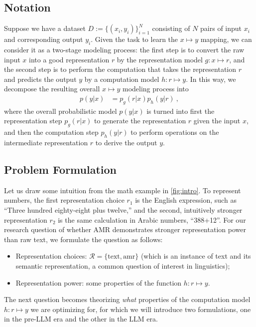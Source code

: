 \subsection{Notation}
Suppose we have a dataset $D:= \{(x_i, y_i)\}_{i=1}^N$ consisting of $N$ pairs of input $x_i$ and corresponding output $y_i$. 
Given the task to learn
the $x \mapsto y$ mapping, we can consider it as a two-stage modeling process: the first step is to convert the raw input $x$ into a good representation $r$ by the representation model $g: x \mapsto r
$,
and the second step is to perform the computation that takes the representation $r$ and predicts the output  $y$ by a computation model $h: r \mapsto y$. In this way, we decompose the resulting
overall $x \mapsto y$ modeling process into
\begin{align}
p(y|x) & = p_g(r|x) p_h(y|r)
~,\label{eq:chain}
\end{align} where the overall probabilistic model $p(y|x)$ is turned into first the representation step $p_g(r|x)$ to generate the representation $r$ given the input $x$, and then the computation step $p_h(y|r)$ to perform operations on the intermediate representation $r$ to derive the output $y$.

\subsection{Problem Formulation}
Let us draw some intuition from the math example in \cref{fig:intro}. To represent numbers, the first representation choice $r_1$ is the English expression, such as ``Three hundred eighty-eight plus twelve,'' and the second, intuitively stronger representation $r_2$ is the same calculation in Arabic numbers, ``388+12''. For our research question of whether AMR demonstrates stronger representation power than
raw text, we formulate the question as follows:
\begin{itemize}
    \item Representation choices: $\mathcal{R} = \{ \mathrm{text}, \mathrm{amr} \}$ (which is an instance of text and its semantic representation, a common question of interest in linguistics);
    \item Representation power: some properties of the function $h: r \mapsto y$.
\end{itemize}
The next question becomes theorizing \textit{what} properties of the computation model $h: r \mapsto y$ we are optimizing for, for which we will introduce two formulations, one in the pre-LLM era and the other in the LLM era.

